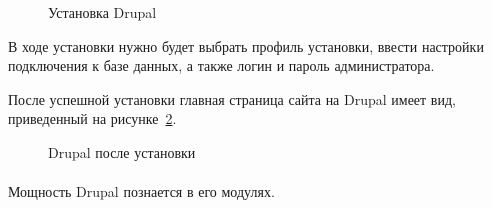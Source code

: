 \begin{figure}[h]
  \centering
  {
    \setlength{\fboxsep}{0pt}%
    \setlength{\fboxrule}{1pt}%
  }
  \caption{Установка Drupal}
  \label{fig:drupal_install}
\end{figure}

В ходе установки нужно будет выбрать профиль установки, 
ввести настройки подключения к базе данных, а также логин и пароль администратора.

После успешной установки главная страница сайта на Drupal имеет вид, 
приведенный на рисунке~\ref{fig:drupal_after_install}.

\begin{figure}[h]
  \centering
  {
    \setlength{\fboxsep}{0pt}%
    \setlength{\fboxrule}{1pt}%
  }
  \caption{Drupal после установки}
  \label{fig:drupal_after_install}
\end{figure}

\paragraph{}
Мощность Drupal познается в его модулях. 

